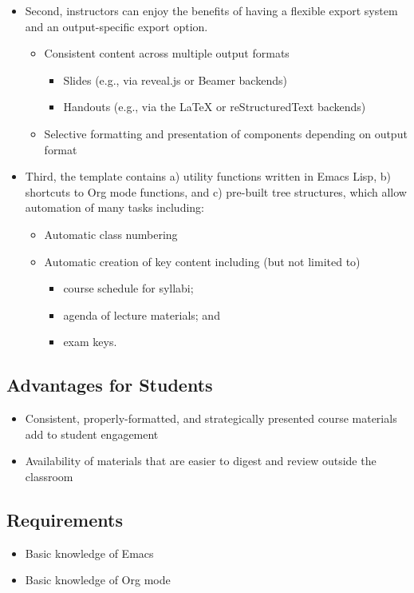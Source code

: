 \documentclass[10pt,article]{article}
\begin{document}
\begin{itemize}
\item Second, instructors can enjoy the benefits of having a flexible export system and an output-specific export option.
\begin{itemize}
\item Consistent content across multiple output formats
\begin{itemize}
\item Slides (e.g., via reveal.js or Beamer backends)
\item Handouts (e.g., via the \LaTeX{} or reStructuredText backends)
\end{itemize}
\item Selective formatting and presentation of components depending on output
format
\end{itemize}
\item Third, the template contains a) utility functions written in Emacs Lisp, b)
shortcuts to Org mode functions, and c) pre-built tree structures, which
allow automation of many tasks including:
\begin{itemize}
\item Automatic class numbering
\item Automatic creation of key content including (but not limited to)
\begin{itemize}
\item course schedule for syllabi;
\item agenda of lecture materials; and
\item exam keys.
\end{itemize}
\end{itemize}
\end{itemize}
\subsection{Advantages for Students}
\label{sec:org332d9b0}
\begin{itemize}
\item Consistent, properly-formatted, and strategically presented course materials add to student engagement
\item Availability of materials that are easier to digest and review outside the classroom
\end{itemize}
\subsection{Requirements}
\label{sec:org1754caf}
\begin{itemize}
\item Basic knowledge of Emacs
\item Basic knowledge of Org mode
\end{itemize}
\end{document}
